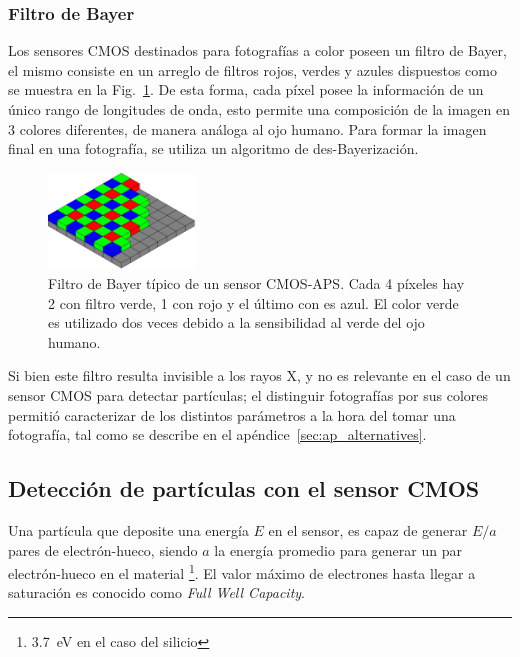 \documentclass[twoside,twocolumn]{article}
\begin{document}
    \subsubsection*{\hspace{5mm}Filtro de Bayer}\label{sec:intro:bayer}
      Los sensores CMOS destinados para fotografías a color poseen un filtro de Bayer, 
      el mismo consiste en un arreglo de filtros rojos, verdes y azules dispuestos como se muestra en la Fig.~\ref{fig:bayer}.
      De esta forma, cada píxel posee la información de un único rango de longitudes de onda, 
      esto permite una composición de la imagen en 3 colores diferentes, de manera análoga al ojo humano.
      Para formar la imagen final en una fotografía, se utiliza un algoritmo de des-Bayerización.\cite{picamera}

      \begin{figure}[h]
        \centering
        \includegraphics[width=0.35\textwidth]{figures/Bayer_pattern.png}
        \caption{Filtro de Bayer típico de un sensor CMOS-APS. Cada 4 píxeles hay 2 con filtro verde, 1 con rojo y el último con es azul.
          El color verde es utilizado dos veces debido a la sensibilidad al verde del ojo humano.}
        \label{fig:bayer}
      \end{figure}

      Si bien este filtro resulta invisible a los rayos X,
      y no es relevante en el caso de un sensor CMOS para detectar partículas;
      el distinguir fotografías por sus colores permitió caracterizar
      de los distintos parámetros a la hora del tomar una fotografía,
      tal como se describe en el apéndice~\ref{sec:ap_alternatives}.


    \subsection{Detección de partículas con el sensor CMOS}\label{sec:intro:detection}   

      Una partícula que deposite una energía $E$ en el sensor,
      es capaz de generar $E / a$ pares de electrón-hueco,
      siendo $a$ la energía promedio para generar un par electrón-hueco en el material
      \footnote{\SI{3.7}{\eV} en el caso del silicio\cite{groom2004temperature}}.
      El valor máximo de electrones hasta llegar a saturación es conocido como \emph{Full Well Capacity}.
\end{document}
